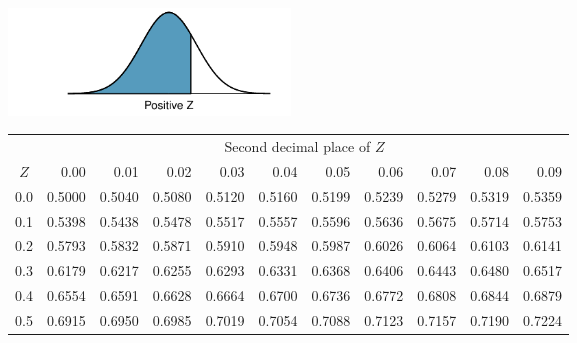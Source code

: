 \begin{table}[p]
\begin{center}{\small
\includegraphics[width=75mm]{extraTeX/tables/figures/normalTails/normalTailRight} \vspace{2mm} \\
\begin{tabular}{c | rrrrr | rrrrr |}
  \cline{2-11}
&&&& \multicolumn{4}{c}{Second decimal place of $Z$} &&& \\
  \cline{2-11}
$Z$ & 0.00 & 0.01 & 0.02 & 0.03 & 0.04 & 0.05 & 0.06 & 0.07 & 0.08 & 0.09 \\
  \hline
  \hline
0.0 & \footnotesize{0.5000} & \footnotesize{0.5040} & \footnotesize{0.5080} & \footnotesize{0.5120} & \footnotesize{0.5160} & \footnotesize{0.5199} & \footnotesize{0.5239} & \footnotesize{0.5279} & \footnotesize{0.5319} & \footnotesize{0.5359} \\
  0.1 & \footnotesize{0.5398} & \footnotesize{0.5438} & \footnotesize{0.5478} & \footnotesize{0.5517} & \footnotesize{0.5557} & \footnotesize{0.5596} & \footnotesize{0.5636} & \footnotesize{0.5675} & \footnotesize{0.5714} & \footnotesize{0.5753} \\
  0.2 & \footnotesize{0.5793} & \footnotesize{0.5832} & \footnotesize{0.5871} & \footnotesize{0.5910} & \footnotesize{0.5948} & \footnotesize{0.5987} & \footnotesize{0.6026} & \footnotesize{0.6064} & \footnotesize{0.6103} & \footnotesize{0.6141} \\
  0.3 & \footnotesize{0.6179} & \footnotesize{0.6217} & \footnotesize{0.6255} & \footnotesize{0.6293} & \footnotesize{0.6331} & \footnotesize{0.6368} & \footnotesize{0.6406} & \footnotesize{0.6443} & \footnotesize{0.6480} & \footnotesize{0.6517} \\
  0.4 & \footnotesize{0.6554} & \footnotesize{0.6591} & \footnotesize{0.6628} & \footnotesize{0.6664} & \footnotesize{0.6700} & \footnotesize{0.6736} & \footnotesize{0.6772} & \footnotesize{0.6808} & \footnotesize{0.6844} & \footnotesize{0.6879} \\
  \hline
  0.5 & \footnotesize{0.6915} & \footnotesize{0.6950} & \footnotesize{0.6985} & \footnotesize{0.7019} & \footnotesize{0.7054} & \footnotesize{0.7088} & \footnotesize{0.7123} & \footnotesize{0.7157} & \footnotesize{0.7190} & \footnotesize{0.7224} \\

\end{tabular}}
\end{center}
\end{table}
